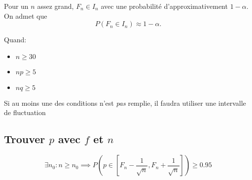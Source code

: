 \documentclass{article}
\begin{document}
Pour un $n$ assez grand, $F_n \in I_n$ avec une probabilité d'approximativement $1 - \alpha$.
On admet que \[
	P(F_n \in I_n) \approx 1-\alpha
.\] 

Quand:
\begin{itemize}
	\item $n \ge 30$
	\item $n p \ge 5$ 
	\item $n q \ge 5$
\end{itemize}

Si au moins une des conditions n'est \emph{pas} remplie,
il faudra utiliser une intervalle de fluctuation

\subsection{Trouver $p$ avec $f$ et $n$}
\[
	\exists n_0 : n \ge n_0 
	\implies P\left(p \in \left[ 
		F_n- \frac{1}{\sqrt{n} }, 
		F_n+\frac{1}{\sqrt{n} } 
	\right] \right) \ge 0.95
\] 
\end{document}

